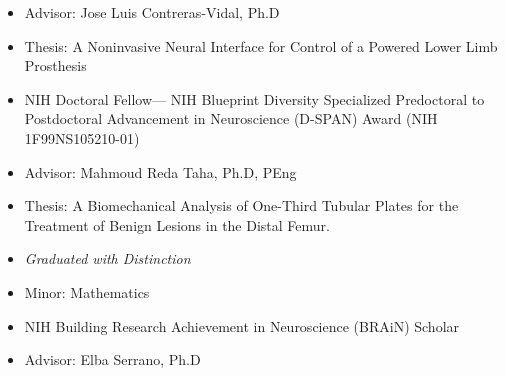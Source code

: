     \begin{itemize}
    \item Advisor: Jose Luis Contreras-Vidal, Ph.D
    \item Thesis: A Noninvasive Neural Interface for Control of a Powered Lower Limb Prosthesis\href{https://uh-ir.tdl.org/handle/10657/5653}{\linkicon}
    \item  \color{heading} NIH Doctoral Fellow---\normalsize \color{body} NIH Blueprint Diversity Specialized Predoctoral to Postdoctoral Advancement in Neuroscience (D-SPAN) Award (NIH 1F99NS105210-01) \href{https://projectreporter.nih.gov/project_info_description.cfm?aid=9470585&icde=37206091}{\linkicon} 
    \end{itemize}
    
    \divider
    
    \begin{itemize}
    \item Advisor: Mahmoud Reda Taha, Ph.D, PEng
    \item Thesis: A Biomechanical Analysis of One-Third Tubular Plates for the Treatment of Benign Lesions in the Distal Femur. \href{http://repository.unm.edu/handle/1928/25732}{\linkicon} %
    \item \emph{Graduated with Distinction}
    \end{itemize}
    
    \divider 
    
    \begin{itemize}
    \item Minor: Mathematics
    \item NIH Building Research Achievement in Neuroscience (BRAiN) Scholar \href{http://brain.nmsu.edu/}{\linkicon}
    \item[] Advisor: Elba Serrano, Ph.D
    \end{itemize}